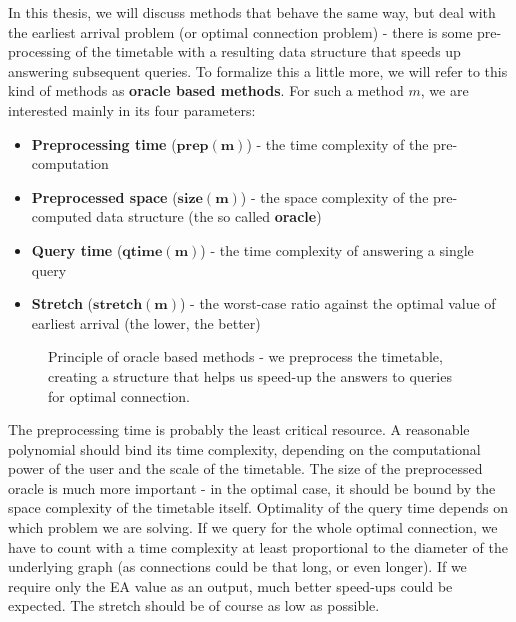 	In this thesis, we will discuss methods that behave the same way, but deal with the earliest arrival problem (or optimal connection problem) - there is some pre-processing of the timetable with a resulting data structure that speeds up answering subsequent queries. To formalize this a little more, we will refer to this kind of methods as \textbf{oracle based methods}. For such a method $m$, we are interested mainly in its four parameters:
	\begin{itemize}
		\item \textbf{Preprocessing time} ($\bm{prep(m)}$) - the time complexity of the pre-computation
		\item \textbf{Preprocessed space} ($\bm{size(m)}$) - the space complexity of the pre-computed data structure (the so called \textbf{oracle})
		\item \textbf{Query time} ($\bm{qtime(m)}$) - the time complexity of answering a single query
		\item \textbf{Stretch} ($\bm{stretch(m)}$) - the worst-case ratio against the optimal value of earliest arrival (the lower, the better)
	\end{itemize}
	\hspace*{\fill}
	
	\begin{figure}[h!]
	    \begin{center}
	    \end{center}
    	\caption{\label{pic:oracle} Principle of oracle based methods - we preprocess the timetable, creating a structure that helps us speed-up the answers to queries for optimal connection.}
	\end{figure}
	
	\noindent The preprocessing time is probably the least critical resource. A reasonable polynomial should bind its time complexity, depending on the computational power of the user and the scale of the timetable. The size of the preprocessed oracle is much more important - in the optimal case, it should be bound by the space complexity of the timetable itself. Optimality of the query time depends on which problem we are solving. If we query for the whole optimal connection, we have to count with a time complexity at least proportional to the diameter of the underlying graph (as connections could be that long, or even longer). If we require only the EA value as an output, much better speed-ups could be expected. The stretch should be of course as low as possible.
	
